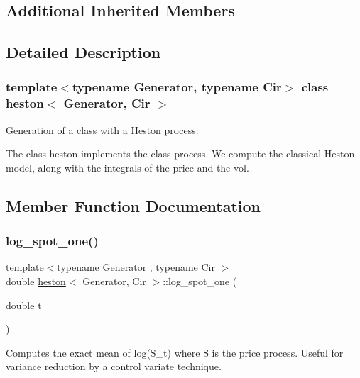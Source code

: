 \subsection*{Additional Inherited Members}


\subsection{Detailed Description}
\subsubsection*{template$<$typename Generator, typename Cir$>$\newline
class heston$<$ Generator, Cir $>$}

Generation of a class with a Heston process. 

The class heston implements the class process. We compute the classical Heston model, along with the integrals of the price and the vol. 

\subsection{Member Function Documentation}
\mbox{\label{classheston_a574fdb0c7e744e931bf3e8fd000ea5ca}} 
\subsubsection{\texorpdfstring{log\+\_\+spot\+\_\+one()}{log\_spot\_one()}}
{\footnotesize\ttfamily template$<$typename Generator , typename Cir $>$ \\
double \mbox{\hyperlink{classheston}{heston}}$<$ Generator, Cir $>$\+::log\+\_\+spot\+\_\+one (\begin{DoxyParamCaption}\item[{double}]{t }\end{DoxyParamCaption})}

Computes the exact mean of log(\+S\+\_\+t) where S is the price process. Useful for variance reduction by a control variate technique. \mbox{\label{classheston_a81ef826578f2a62320698e88cc2b1b3b}} 
